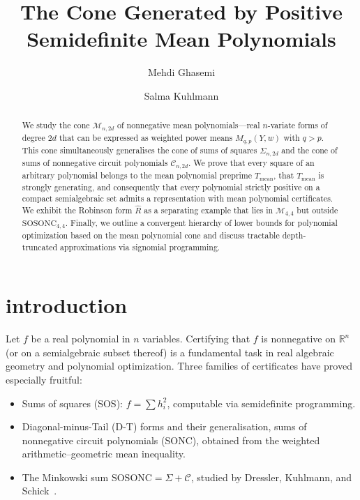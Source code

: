 \documentclass{amsart}
\title[PSD Mean Polynomials]{The Cone Generated by Positive Semidefinite Mean Polynomials}
\date{}
\author{Mehdi Ghasemi}
\author{Salma Kuhlmann}
\theoremstyle{definition}
\numberwithin{equation}{section}
\newcommand{\reals}{\mathbb{R}}
\begin{document}
\begin{abstract}
We study the cone $\mathcal{M}_{n,2d}$ of nonnegative mean polynomials---real
$n$-variate forms of degree $2d$ that can be expressed as weighted power
means $M_{q,p}(Y,w)$ with $q>p$.  This cone simultaneously generalises the
cone of sums of squares $\Sigma_{n,2d}$ and the cone of sums of nonnegative
circuit polynomials $\mathcal{C}_{n,2d}$.  We prove that every square of an
arbitrary polynomial belongs to the mean polynomial preprime
$T_{\mathrm{mean}}$, that $T_{\mathrm{mean}}$ is strongly generating, and
consequently that every polynomial strictly positive on a compact
semialgebraic set admits a representation with mean polynomial certificates.
We exhibit the Robinson form $\hat{R}$ as a separating example that lies in
$\mathcal{M}_{4,4}$ but outside $\mathrm{SOSONC}_{4,4}$.  Finally, we
outline a convergent hierarchy of lower bounds for polynomial optimization
based on the mean polynomial cone and discuss tractable depth-truncated
approximations via signomial programming.
\end{abstract}

\maketitle

\section{introduction}\label{sec:intro}

Let $f$ be a real polynomial in $n$ variables.  Certifying that $f$ is
nonnegative on $\reals^n$ (or on a semialgebraic subset thereof) is a
fundamental task in real algebraic geometry and polynomial optimization.
Three families of certificates have proved especially fruitful:

\begin{itemize}
  \item Sums of squares (SOS): $f = \sum h_i^2$, computable via semidefinite
  programming.
  \item Diagonal-minus-Tail (D-T) forms and their generalisation, sums of
  nonnegative circuit polynomials (SONC), obtained from the weighted
  arithmetic--geometric mean inequality.
  \item The Minkowski sum $\mathrm{SOSONC} = \Sigma + \mathcal{C}$, studied
  by Dressler, Kuhlmann, and Schick~\cite{DresslerSchick2025}.
\end{itemize}
\end{document}
